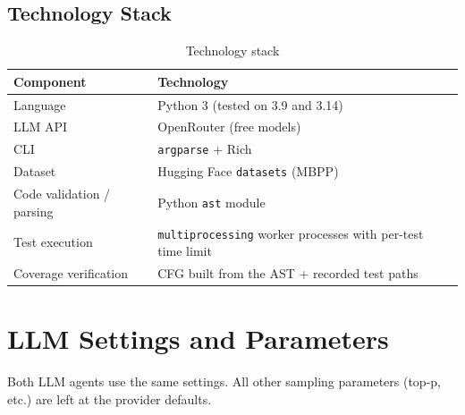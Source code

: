 \documentclass[12pt, a4paper]{article}
\begin{document}
\subsection{Technology Stack}

\begin{table}[H]
    \centering
    \begin{tabular}{ll}
        \toprule
        \textbf{Component} & \textbf{Technology} \\
        \midrule
        Language & Python 3 (tested on 3.9 and 3.14) \\
        LLM API & OpenRouter (free models) \\
        CLI & \texttt{argparse} + Rich \\
        Dataset & Hugging Face \texttt{datasets} (MBPP) \\
        Code validation / parsing & Python \texttt{ast} module \\
        Test execution & \texttt{multiprocessing} worker processes with per-test time limit \\
        Coverage verification & CFG built from the AST + recorded test paths \\
        \bottomrule
    \end{tabular}
    \caption{Technology stack}
\end{table}

\section{LLM Settings and Parameters}
\label{sec:settings}

Both LLM agents use the same settings. All other sampling parameters (top-p, etc.) are left at the provider defaults.
\end{document}
